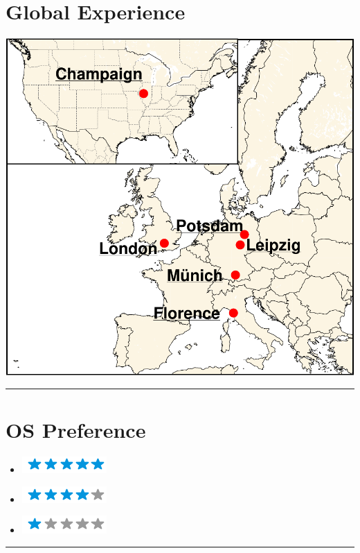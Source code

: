 \documentclass{article}
\begin{document}
\begin{minipage}[t]{0.27\textwidth}
	\centering
	\section*{\hfill\fontsize{18pt}{24pt}\selectfont\color{pblue}Global Experience}
	\vspace{-2mm}
	\includegraphics[trim=0.2cm 0.2cm 0.2cm 0.2cm, clip,scale=0.3, frame]{../img/globalEXPENG.pdf}
	\vspace{2mm}
	\hrule
	\vspace{-3mm}
	\section*{\fontsize{18pt}{24pt}\selectfont \color{pblue} OS Preference}
	\vspace{-2mm}
	\begin{itemize}
	\centering
	\item[\textbf{\LARGE \faLinux}]\includegraphics[trim=0.2cm 0.2cm 0.1cm 0.1cm,clip,scale=0.7]{../img/5stars.png}\vspace{-2mm}
	\item[\textbf{\LARGE \faWindows}]\includegraphics[trim=0.2cm 0.2cm 0.1cm 0.1cm,clip,scale=0.7]{../img/4stars.png}\vspace{-2mm}
    \item[\textbf{\LARGE \faApple}]\includegraphics[trim=0.2cm 0.2cm 0.1cm 0.1cm,clip,scale=0.7]{../img/1stars.png}
    \end{itemize}
	\hrule
	\vspace{-2mm}

\end{minipage}
\end{document}
